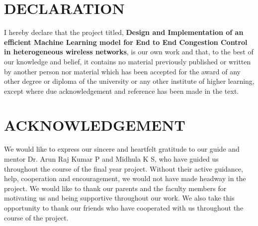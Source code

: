 \documentclass[12pt]{report}
\begin{document}
\begin{spacing}{1.01}
{{\begin{tabular}{p{3cm}p{6cm}p{6cm}}
\end{tabular}
}
}
\chapter*{DECLARATION}
I hereby declare that the project titled, \textbf{Design and Implementation of an efficient Machine Learning model for End to End Congestion Control in heterogeneous wireless networks}, is our own work and that, to the best of our knowledge and belief, it contains no material previously published or written by another person nor material which has been accepted for the award of any other degree or diploma of the university or any other institute of higher learning, except where due acknowledgement and reference has been made in the text.\\

\vspace{2cm}
\newpage 

\begin{abstract}

\end{abstract}

\chapter*{\rm \large \bf ACKNOWLEDGEMENT}
We would like to express our sincere and heartfelt gratitude to our guide and mentor Dr. Arun Raj Kumar P and Midhula K S, who have guided us throughout the course of the final year project.  Without their active guidance, help, cooperation and encouragement, we would not have made headway in the project.  We would like to thank our parents and the faculty members for motivating us and being supportive throughout our work. We also take this opportunity to thank our friends who have cooperated with us throughout the course of the project.

\vspace{4.0mm}
\tableofcontents
{}
\end{spacing}
\listoffigures
\listoftables
\vspace{-2 em}
\end{document}
